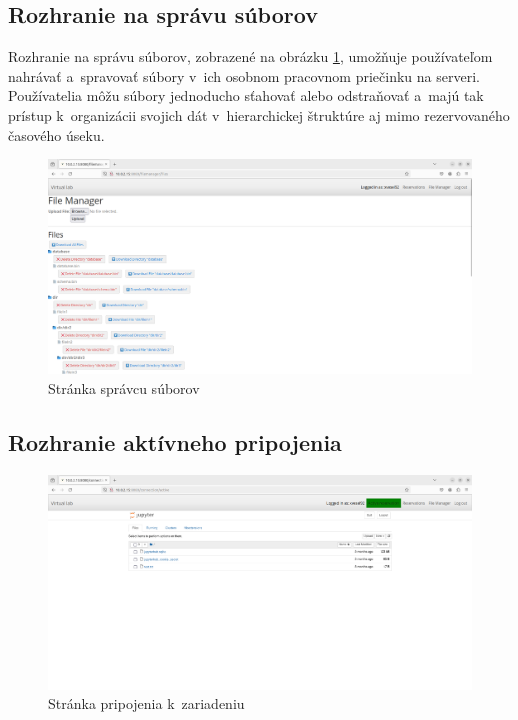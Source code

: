 \subsection{Rozhranie na správu súborov}

Rozhranie na správu súborov, zobrazené na obrázku \ref{Filemanager}, umožňuje používateľom nahrávať a~spravovať súbory v~ich osobnom pracovnom priečinku na serveri. Používatelia môžu súbory jednoducho sťahovať alebo odstraňovať a~majú tak prístup k~organizácii svojich dát v~hierarchickej štruktúre aj mimo rezervovaného časového úseku.

\begin{figure} \label{Filemanager}
    \centering
    \includegraphics[width=1\linewidth]{obrazky-figures/Filemanager_site.png}
    \caption{Stránka správcu súborov}
\end{figure}

\subsection{Rozhranie aktívneho pripojenia}

\begin{figure} \label{Active connection}
    \centering
    \includegraphics[width=1\linewidth]{obrazky-figures/Active_connection_site.png}
    \caption{Stránka pripojenia k~zariadeniu}
\end{figure}

